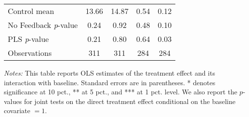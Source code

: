 \begin{table}[ht]
{\begin{threeparttable}
\begin{tabular}{l*{4}{c}}
Control mean    &    13.66         &    14.87         &     0.54         &     0.12         \\
No Feedback \emph{p}-value&     0.24         &     0.92         &     0.48         &     0.10         \\
PLS \emph{p}-value&     0.21         &     0.80         &     0.64         &     0.03         \\
Observations    &      311         &      311         &      284         &      284         \\
\bottomrule \end{tabular} \begin{tablenotes}[flushleft] \footnotesize \item \emph{Notes:} This table reports OLS estimates of the treatment effect and its interaction with baseline. Standard errors are in parentheses. * denotes significance at 10 pct., ** at 5 pct., and *** at 1 pct. level. We also report the \(p\)-values for joint tests on the direct treatment effect conditional on the baseline covariate $= 1$. \end{tablenotes} \end{threeparttable} } \end{table}

